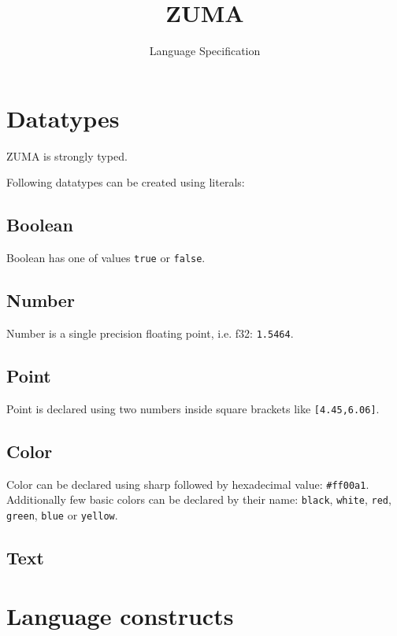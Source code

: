 \documentclass{scrreprt}
\title{ZUMA}
\subtitle{Language Specification}
\date{}
\author{}
\begin{document}

\maketitle

\tableofcontents

\newpage


\chapter{Datatypes}

ZUMA is strongly typed.

Following datatypes can be created using literals:

\section{Boolean}

Boolean has one of values \texttt{true} or \texttt{false}.

\section{Number}

Number is a single precision floating point, i.e. f32: \texttt{1.5464}.

\section{Point}

Point is declared using two numbers inside square brackets like \texttt{[4.45,6.06]}.

\section{Color}

Color can be declared using sharp followed by hexadecimal value: \texttt{\#ff00a1}. Additionally few basic colors can be declared by their name: \texttt{black}, \texttt{white}, \texttt{red}, \texttt{green}, \texttt{blue} or \texttt{yellow}.

\section{Text}

\chapter{Language constructs}
\end{document}
